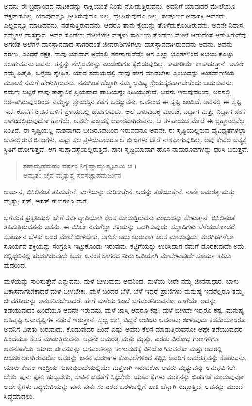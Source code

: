 ಅವನು ಈ ಬ್ರಹ್ಮಾಂಡದ ನಾಟಕವನ್ನು ಸಾಕ್ಷಿಯಂತೆ ನಿಂತು ನೋಡುತ್ತಿರುವನು. ಅವನಿಗೆ ಯಾವುದರ ಮೇಲೆಯೂ ಪಕ್ಷಪಾತವಿಲ್ಲ. ಯಾವುದನ್ನೂ ಪ್ರೀತಿಸುವುದೂ ಇಲ್ಲ, ದ್ವೇಷಿಸುವುದೂ ಇಲ್ಲ. ಸಂಪೂರ್ಣ ಅನಾಸಕ್ತಿ ಅವನದು. ಎಲ್ಲವನ್ನೂ ಮಾಡಿದವನು, ನಡೆಸುತ್ತಿರುವವನು. ಆದರೂ ತಾನು ಕೈಯನ್ನು ತೊಳೆದುಕೊಂಡಿರುವನು. ಅವನೇ ನಿವಾಸ, ನಮ್ಮಗಳ ವಾಸಸ್ಥಾನ. ಅವನ ತೊಡೆಯ ಮೇಲೆಯೇ ಮಕ್ಕಳು ತಾಯಿಯ ತೊಡೆಯ ಮೇಲೆ ಆಡುವಂತೆ ಆಡುತ್ತಿರುವೆವು. ಅಗಣಿತ ಅಲೆಗಳ ವಾಸಸ್ಥಾನವಾದ ಸಾಗರದಂತೆ ಜೀವರಾಶಿಗಳಿಗೆಲ್ಲಾ ವಾಸಸ್ಥಾನವಾಗಿರುವವನು ಅವನು. ಅವನು ಶರಣು, ಎಂದರೆ ರಕ್ಷಕ. ನಾವು ಯಾವಾಗ ಅವನಲ್ಲಿ ಶರಣಾಗುವೆವೊ ಆಗ ಎಲ್ಲಾ ಭೂತಗಳಿಂದ ಅಭಯ ಕೊಟ್ಟು ಸಲಹುವವನು ಅವನು. ತನ್ನನ್ನು ನೆಚ್ಚಿದವರನ್ನು ಎಂದೆಂದಿಗೂ ಕೈಬಿಡುವುದಿಲ್ಲ. ಕಾಪಾಡಿಯೇ ಕಾಪಾಡುತ್ತಾನೆ. ಅವನೇ ನಮ್ಮ ಹಿತೈಷಿ, ಒಳ್ಳೆಯ ಸ್ನೇಹಿತ. ಯಾವ ಸಮಯದಲ್ಲಿ ನಾವು ಹೇಗೆ ಮಾಡಬೇಕು ಎಂಬುದನ್ನು ಅಂತರ್ವಾಣಿಯ ಮೂಲಕ ನಮಗೆ ಹೇಳುತ್ತಿರುವನು. ನಮಗಿಂತ ಹೆಚ್ಚಾಗಿ ನಮ್ಮ ಭವಿಷ್ಯ ಶ್ರೇಯಸ್ಕರವಾಗಬೇಕೆಂದು ಬಯಸುವನು. ನಮಗೇ ಬಿಟ್ಟರೆ ನಾವು ತಾತ್ಕಾಲಿಕ ಪ್ರಿಯವಾದ ಹಾದಿಯನ್ನೇ ಹಿಡಿಯುತ್ತೇವೆ. ಅವನು ಇರುವುದರಿಂದ, ಅವನಲ್ಲಿ ಶರಣಾಗಿರುವುದರಿಂದ, ನಮ್ಮನ್ನು ಶ್ರೇಯಸ್ಸಿನ ಕಡೆಗೆ ಒಯ್ಯುವನು. ಅವನಿಂದ ಈ ಸೃಷ್ಟಿ ಬಂದಿದೆ. ಅವನಲ್ಲಿ ಈ ಸೃಷ್ಟಿ ಇದೆ. ಕೊನೆಗೆ ಅವನ ಬಳಿಗೆ ಪ್ರಳಯದಲ್ಲಿ ಹೋಗುವುದು. ಅಲೆ ಏಳುವುದಕ್ಕೆ ಮುಂಚೆ, ಎದ್ದಾಗ ಮತ್ತು ಬಿದ್ದಾಗ ಹೇಗೆ ಸಾಗರದಲ್ಲಿರುವುದೋ ಹಾಗೆಯೆ. ಅವನೇ ಎಲ್ಲದಕ್ಕೆ ಆಧಾರವಾಗಿರುವನು. ಆ ತಳಪಾಯದ ಮೇಲೆ ಈ ಬ್ರಹ್ಮಾಂಡವೆಲ್ಲ ನಿಂತಿದೆ. ಈ ಸೃಷ್ಟಿಯಲ್ಲಿ ನಾಶವಾಗದ ಬೀಜರೂಪದಿಂದ ಇರುವವನೂ ಅವನೇ. ಈ ಸೃಷ್ಟಿಯಲ್ಲಿರುವ ವೈವಿಧ್ಯತೆಗಳೆಲ್ಲಾ ಅವನಲ್ಲಿರುವ ಬೀಜಗಳು. ಎಷ್ಟು ಸಲ ಪ್ರಳಯವಾದರೂ ಆ ಬೀಜಗಳು ಬೇರೆ ನಾಶವಾಗುವುದಿಲ್ಲ. ಅವು ಕೇವಲ ಅವ್ಯಕ್ತ ಸ್ಥಿತಿಗೆ ಹೋಗುತ್ತವೆ. ಆಗ ಸುಪ್ತಾವಸ್ಥೆಯಲ್ಲಿರುತ್ತವೆ. ಪುನಃ ಸೃಷ್ಟಿಯಾದಾಗ ಹೊಸ ನಾಮರೂಪಗಳನ್ನು ಧರಿಸಿ ಬರುತ್ತವೆ.

\begin{verse}
ತಪಾಮ್ಯಹಮಹಂ ವರ್ಷಂ ನಿಗೃಹ್ಣಾಮ್ಯುತ್ಸೃಜಾಮಿ ಚ ।\\ಅಮೃತಂ ಚೈವ ಮೃತ್ಯುಶ್ಚ ಸದಸಚ್ಚಾಹಮರ್ಜುನ 
\end{verse}

{\small ಅರ್ಜುನ, ಬಿಸಿಲಿನಂತೆ ತಪಿಸುತ್ತೇನೆ, ಮಳೆಯನ್ನು ಸುರಿಸುತ್ತೇನೆ. ಅದನ್ನು ತಡೆಯುತ್ತೇನೆ. ನಾನೇ ಅಮರತ್ವ ಮತ್ತು ಮೃತ್ಯು; ಸತ್, ಅಸತ್ ಗುಣಗಳೂ ನಾನೆ.}

ಭಗವಂತ ಪ್ರಕೃತಿಯಲ್ಲಿ ಹೇಗೆ ಸರ್ವವ್ಯಾಪಿಯಾಗಿ ಕೆಲಸ ಮಾಡುತ್ತಿರುವನು ಎಂಬುದನ್ನು ಹೇಳುತ್ತಾನೆ. ಬಿಸಿಲಿನಂತೆ ತಪಿಸುತ್ತಿರುವವನು ಅವನು. ಈ ಬಿಸಿಲೇ ನಮಗೆಲ್ಲಾ ಶಕ್ತಿಯನ್ನು ಒದಗಿಸುವುದು. ಸಸ್ಯಾದಿಗಳು ಬೆಳೆಯಬೇಕಾದರೆ ಸೂರ್ಯನ ಬೆಳಕು ಅದರ ಮೇಲೆ ಬೀಳಬೇಕು. ಆಗಲೇ ಅದು ಚುರುಕಾಗಿ ಕೆಲಸ ಮಾಡುವುದು. ಮರಗಿಡಗಳೆಲ್ಲಾ ಸೂರ್ಯನ ಶಕ್ತಿಯನ್ನು ಸಂಗ್ರಹಿಸಿ ಇಟ್ಟುಕೊಂಡು ಇರುವುವು. ಕಟ್ಟಿಗೆಯನ್ನು ಉರಿಸಿದಾಗ ನಮಗೆ ದೊರಕುವುದೇ ಅದು. ಕಲ್ಲಿದ್ದಲಿನಲ್ಲಿ ಹುದುಗಿರುವುದೇ ಅದು. ಅನಂತ ಸಾಗರದ ನೀರು ಆವಿಯಾಗಿ ಮೇಲೇಳುವುದೇ ಸೂರ್ಯ ತಪಿಸು ವುದರಿಂದ.

ಮಳೆಯನ್ನು ಸುರಿಸುತ್ತೇನೆ ಎನ್ನುವನು. ಮಳೆ ಬೀಳುವುದು ಅವನಿಂದ. ಮಳೆಯ ನೀರೇ ನಮ್ಮ ಜೀವನಾಧಾರ. ಬಾಳು ವಿಕಾಸವಾಗಬೇಕಾದರೆ ಮಳೆ ಬೀಳಬೇಕು. ಮಳೆ ಬಂದರೆ ಬೆಳೆ, ಬೆಳೆ ಇದ್ದರೆ ಪ್ರಾಣಿಗಳು ಮನುಷ್ಯ ಇವರೆಲ್ಲರೂ ತಮ್ಮ ಜೀವಗತಿಯನ್ನು ಅನುಸರಿಸಬೇಕಾದರೆ. ಹೇಗೆ ಮಳೆಯ ಹಿಂದೆ ಭಗವಂತನಿರುವನೋ ಹಾಗೆಯೇ ಅದನ್ನು ತಡೆಯುವುದರ ಹಿಂದೆಯೂ ಅವನೇ ಇರುವನು. ಮಳೆ ಜಾಸ್ತಿ ಆದರೂ ಕಷ್ಟ; ಮಳೆ ಬೀಳದೇ ಇದ್ದರೂ ಕಷ್ಟ. ಮನುಷ್ಯ ಅತಿವೃಷ್ಟಿ ಅನಾವೃಷ್ಟಿಗಳ ನಡುವೆ ಇರುತ್ತಾನೆ. ಸ್ವಲ್ಪ ಜಾಸ್ತಿ ಬಿದ್ದರೆ ಆಯಿತು ಅವನಾಟ; ಬೀಳುವುದು ಕಡಮೆಯಾದರೂ ಅವನಿಗೆ ವಿಪತ್ತು ಬರುವುದು. ಕೊಡುವುದರ ಹಿಂದೆ ಎಷ್ಟು ಅವನು ಕೆಲಸ ಮಾಡುತ್ತಿರುವನೋ ಅಷ್ಟೇ ತಡೆಯುವುದರ ಹಿಂದೆಯೂ ಕೆಲಸ ಮಾಡುತ್ತಿರುವನು. ಅವನೇ ಅಮರತ್ವ ಮತ್ತು ಮೃತ್ಯು. ಎರಡು ವಿರೋಧ ಗುಣಗಳಿಗೂ ಅವನೊಡೆಯ. ಯಾರು ಜೀವನವನ್ನು ಭಗವಂತನನ್ನು ಕಾಣುವುದಕ್ಕೆ ವಿನಿಯೋಗಿಸುವರೋ ಮತ್ತು ಅದರಲ್ಲಿ ಜಯಶೀಲರಾಗಿರುವರೋ ಅವರನ್ನು ಜನನ ಮರಣಗಳ ಕೋಟಲೆಗಳಿಂದ ತಪ್ಪಿಸಿ ಅವರಿಗೆ ಅಮರತ್ವವನ್ನು ಕೊಡುವನು. ಯಾರು ಕೇವಲ ಇಂದ್ರಿಯ ಸುಖಾಭಿಲಾಶೆಯಲ್ಲಿಯೇ ಮತ್ತರಾಗಿ ಇರುವರೋ ಅವರು ಮೃತ್ಯುವನ್ನು ಅನುಭವಿಸಲೇ ಬೇಕು. ಪುನಃ ಪುನಃ ಹುಟ್ಟಬೇಕು, ಸಾವಿನ ದವಡೆಗೆ ಸಿಕ್ಕಬೇಕು. ಯಾವ ಕೈಗಳು ಮುಕ್ತನನ್ನು ಬಿಡುಗಡೆ ಮಾಡುವುವೋ ಅದೇ ಕೈಗಳು ಬದ್ಧಜೀವಿಯನ್ನು ಪುನಃ ಪುನಃ ಸಂಸಾರದ ಒರಳುಕಲ್ಲಿಗೆ ಹಾಕಿ ಚೆನ್ನಾಗಿ ರುಬ್ಬುತ್ತಿದೆ, ಅವನನ್ನು ಮುಂದೆ ಸಿದ್ಧಮಾಡಲು.


